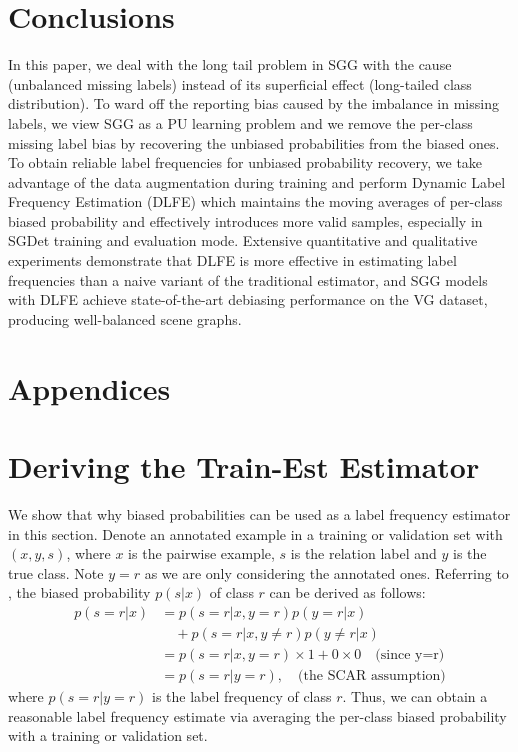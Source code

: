 \documentclass[sigconf]{acmart}
\begin{document}
\section{Conclusions}
In this paper, we deal with the long tail problem in SGG with the cause (unbalanced missing labels) instead of its superficial effect (long-tailed class distribution).
To ward off the reporting bias caused by the imbalance in missing labels, we view SGG as a PU learning problem and we remove the per-class missing label bias by recovering the unbiased probabilities from the biased ones.
To obtain reliable label frequencies for unbiased probability recovery, we take advantage of the data augmentation during training and perform Dynamic Label Frequency Estimation (DLFE) which maintains the moving averages of per-class biased probability and effectively introduces more valid samples, especially in SGDet training and evaluation mode.
Extensive quantitative and qualitative experiments demonstrate that DLFE is more effective in estimating label frequencies than a naive variant of the traditional estimator, and SGG models with DLFE achieve state-of-the-art debiasing performance on the VG dataset, producing well-balanced scene graphs.




\balance


\newpage

\nobalance

{}
\section*{Appendices}
\setcounter{section}{0}
\renewcommand{\thesection}{\Alph{section}}
\renewcommand{\theHsection}{appendixsection.\Alph{section}}

\section{Deriving the Train-Est Estimator}
\label{sec:appendix_derive_train_est}
We show that why biased probabilities can be used as a label frequency estimator in this section. 
Denote an annotated example in a training or validation set with $(x, y, s)$, where $x$ is the pairwise example, $s$ is the relation label and $y$ is the true class.
Note $y=r$ as we are only considering the annotated ones.
Referring to \cite{elkan2008learning}, the biased probability $p(s|x)$ of class $r$ can be derived as follows:
\begin{align*}
    p(s=r|x) &= p(s=r|x, y=r)p(y=r|x)\\ 
             &\quad  + p(s=r|x, y\neq r)p(y\neq r|x) \\
             &= p(s=r|x, y=r)\times 1 + 0  \times 0\quad \text{(since y=r)}\\
             &= p(s=r|y=r), \quad \text{(the SCAR assumption)}
\end{align*}
where $p(s=r|y=r)$ is the label frequency of class $r$.
Thus, we can obtain a reasonable label frequency estimate via averaging the per-class biased probability with a training or validation set.
\end{document}
